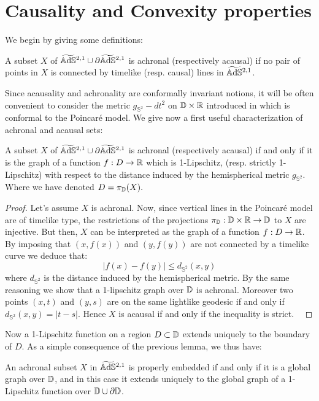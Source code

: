 \section{Causality and Convexity properties}
We begin by giving some definitions:
\begin{definition}
    A subset $X$ of $\widetilde{\mathbb{A}\mathrm{d}\mathbb{S}}{}^{2,1}\cup \partial\widetilde{\mathbb{A}\mathrm{d}\mathbb{S}}{}^{2,1}$ is achronal (respectively acausal) if no pair of points in $X$ is connected by timelike (resp. causal) lines in $\widetilde{\mathbb{A}\mathrm{d}\mathbb{S}}{}^{2,1}$.
\end{definition}
Since acausality and achronality are conformally invariant notions, it will be often convenient to consider the metric $g_{\mathbb{S}^2}-dt^2$ on $\mathbb{D}\times\mathbb{R}$ introduced in  which is conformal to the Poincaré model. We give now a first useful characterization of achronal and acausal sets:
\begin{lemma}
    A subset $X$ of $\widetilde{\mathbb{A}\mathrm{d}\mathbb{S}}{}^{2,1}\cup \partial\widetilde{\mathbb{A}\mathrm{d}\mathbb{S}}{}^{2,1}$ is achronal (respectively acausal) if and only if it is the graph of a function $f:D\to\mathbb{R}$ which is 1-Lipschitz, (resp. strictly 1-Lipschitz) with respect to the distance induced by the hemispherical metric $g_{\mathbb{S}^2}$.\\
    Where we have denoted $D=\pi_{\mathbb{D}}(X).$ 
\end{lemma}
\begin{proof}
     Let's assume $X$ is achronal. Now, since vertical lines in the Poincaré model are of timelike type, the restrictions of the projections $\pi_{\mathbb{D}}:\mathbb{D}\times\mathbb{R}\to\mathbb{D}$ to $X$ are injective. But then, $X$ can be interpreted as the graph of a function $f:D\to\mathbb{R}$. By imposing that $(x,f(x))$ and $(y,f(y))$ are not connected by a timelike curve we deduce that: 
     \begin{equation}\label{soloqua}
        |f(x)-f(y)|\leq d_{\mathbb{S}^2}(x,y)
     \end{equation}
     where $d_{\mathbb{S}^2}$ is the distance induced by the hemispherical metric. By the same reasoning we show that a 1-lipschitz graph over $\mathbb{D}$ is achronal. Moreover two points $(x,t)$ and $(y,s)$ are on the same lightlike geodesic if and only if $d_{\mathbb{S}^2}(x,y)=|t-s|$. Hence $X$ is acausal if and only if the inequality  is strict. \
\end{proof}

Now a 1-Lipschitz function on a region $D\subset \mathbb{D}$ extends uniquely to the boundary of $D$. As a simple consequence of the previous lemma, we thus have: 

\begin{lemma}\label{achronalgraph}
    An achronal subset $X$ in $\widetilde{\mathbb{A}\mathrm{d}\mathbb{S}}{}^{2,1}$ is properly embedded if and only if it is a global graph over $\mathbb{D}$, and in this case it extends uniquely to the global graph of a 1-Lipschitz function over $\mathbb{D}\cup\partial\mathbb{D}$.
\end{lemma}

